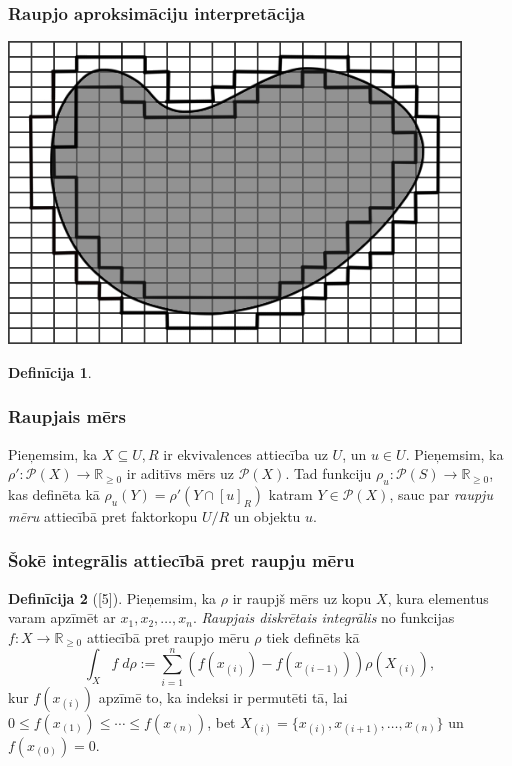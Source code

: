 \documentclass{beamer}
\theoremstyle{definition}
\newtheorem{definicija}{Definīcija}
\begin{document}
\begin{frame}
\frametitle{Raupjo aproksimāciju interpretācija}
  \centering
\includegraphics[width=0.9\textwidth]{raupjaaproks} 
\end{frame}
\begin{frame}
\begin{definicija}
\frametitle{Raupjais mērs}
Pieņemsim, ka $X \subseteq U, R$ ir ekvivalences attiecība uz $U$,
un ${u \in U}$. Pieņemsim, ka $\rho' : \mathscr{P}(X) \rightarrow \mathbb{R}_{\geq
0}$ ir aditīvs mērs uz $\mathscr{P}(X)$. Tad funkciju ${\rho_u : \mathscr{P}(S)
\rightarrow \mathbb{R}_{\geq 0}}$, kas definēta kā $\rho_u(Y) = \rho'(Y\cap
[u]_R)$ katram $Y \in \mathscr{P}(X)$, sauc par \emph{raupju mēru} attiecībā pret
faktorkopu $U/R$ un objektu $u$.
\end{definicija}
\end{frame}

\begin{frame}
\frametitle{Šokē integrālis attiecībā pret raupju mēru}
\begin{definicija}[{[5]}]
Pieņemsim, ka $\rho$ ir raupjš mērs uz kopu $X$, kura elementus varam apzīmēt ar
$x_1,x_2,\dots,x_n$. \emph{Raupjais diskrētais integrālis} no funkcijas
$f:X\rightarrow \mathbb{R}_{\geq 0}$ attiecībā pret raupjo mēru $\rho$ tiek
definēts kā
\begin{equation} \label{eq:raupj}
  \int_Xf\;d\rho := \sum_{i=1}^n(f(x_{(i)})-f(x_{(i-1)}))\rho(X_{(i)}),
\end{equation}
kur $f(x_{(i)})$ apzīmē to, ka indeksi ir permutēti tā, lai $0 \leq
  f(x_{(1)})\leq \cdots \leq f(x_{(n)})$, bet $ X_{(i)} =
  {\{x_{(i)},x_{(i+1)},\dots,x_{(n)}\}}$ un $f(x_{(0)}) = 0$.
\end{definicija}
\end{frame}
\end{document}
